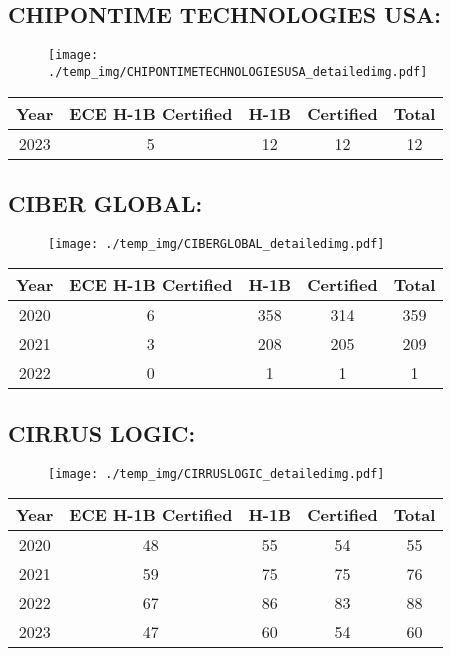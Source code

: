 \documentclass{article}%
\begin{document}
%
\newpage%
\subsection{CHIPONTIME TECHNOLOGIES USA:}%
\label{subsec:CHIPONTIMETECHNOLOGIESUSA}%
\label{CHIPONTIMETECHNOLOGIESUSAdetailed}%


\begin{figure}[htbp]%
\centering%
\texttt{[image: ./temp\_img/CHIPONTIMETECHNOLOGIESUSA\_detailedimg.pdf]}%
\end{figure}

%
\begin{longtable}{c|c|c|c|c}%
\hline%
Year&ECE H{-}1B Certified&H{-}1B&Certified&Total\\%
\hline%
2023&5&12&12&12\\%
\hline%
\end{longtable}

%
\newpage%
\subsection{CIBER GLOBAL:}%
\label{subsec:CIBERGLOBAL}%
\label{CIBERGLOBALdetailed}%


\begin{figure}[htbp]%
\centering%
\texttt{[image: ./temp\_img/CIBERGLOBAL\_detailedimg.pdf]}%
\end{figure}

%
\begin{longtable}{c|c|c|c|c}%
\hline%
Year&ECE H{-}1B Certified&H{-}1B&Certified&Total\\%
\hline%
2020&6&358&314&359\\%
\hline%
2021&3&208&205&209\\%
\hline%
2022&0&1&1&1\\%
\hline%
\end{longtable}

%
\newpage%
\subsection{CIRRUS LOGIC:}%
\label{subsec:CIRRUSLOGIC}%
\label{CIRRUSLOGICdetailed}%


\begin{figure}[htbp]%
\centering%
\texttt{[image: ./temp\_img/CIRRUSLOGIC\_detailedimg.pdf]}%
\end{figure}

%
\begin{longtable}{c|c|c|c|c}%
\hline%
Year&ECE H{-}1B Certified&H{-}1B&Certified&Total\\%
\hline%
2020&48&55&54&55\\%
\hline%
2021&59&75&75&76\\%
\hline%
2022&67&86&83&88\\%
\hline%
2023&47&60&54&60\\%
\hline%
\end{longtable}
\end{document}
